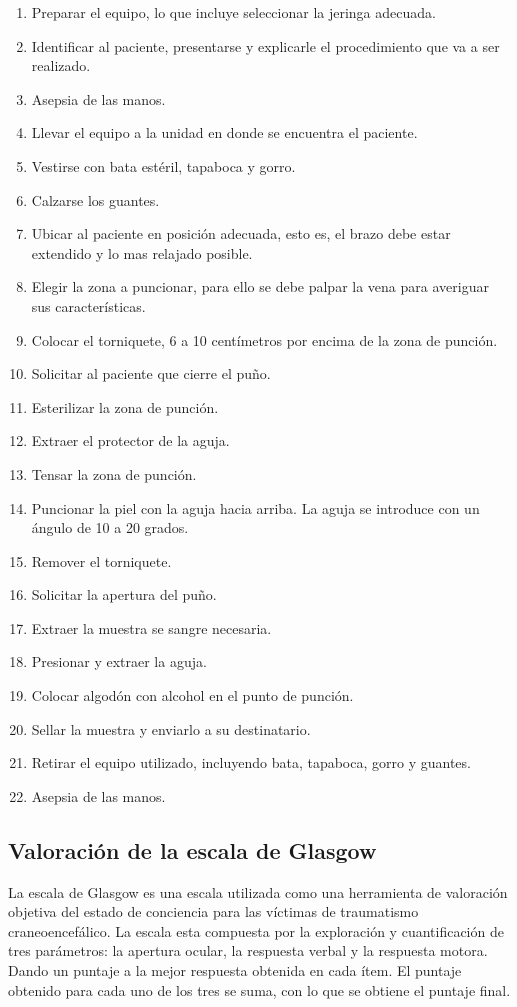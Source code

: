 \begin{enumerate}
\item Preparar el equipo, lo que incluye seleccionar la jeringa adecuada.
\item Identificar al paciente, presentarse y explicarle el procedimiento que va
    a ser realizado.
\item Asepsia de las manos.
\item Llevar el equipo a la unidad en donde se encuentra el paciente.
\item Vestirse con bata estéril, tapaboca y gorro.
\item Calzarse los guantes.
\item Ubicar al paciente en posición adecuada, esto es, el brazo debe estar
    extendido y lo mas relajado posible.
\item Elegir la zona a puncionar, para ello se debe palpar la vena para
    averiguar sus características.
\item Colocar el torniquete, 6 a 10 centímetros por encima de la zona de
    punción.
\item Solicitar al paciente que cierre el puño.
\item Esterilizar la zona de punción.
\item Extraer el protector de la aguja.
\item Tensar la zona de punción.
\item Puncionar la piel con la aguja hacia arriba. La aguja se introduce con un
    ángulo de 10 a 20 grados.
\item Remover el torniquete.
\item Solicitar la apertura del puño.
\item Extraer la muestra se sangre necesaria.
\item Presionar y extraer la aguja.
\item Colocar algodón con alcohol en el punto de punción.
\item Sellar la muestra y enviarlo a su destinatario.
\item Retirar el equipo utilizado, incluyendo bata, tapaboca, gorro y guantes.
\item Asepsia de las manos.
\end{enumerate}


\subsection{Valoración de la escala de Glasgow}

La escala de Glasgow es una escala utilizada como una herramienta de valoración
objetiva del estado de conciencia para las víctimas de traumatismo
craneoencefálico. La escala esta compuesta por la exploración y cuantificación
de tres parámetros: la apertura ocular, la respuesta verbal y la respuesta
motora. Dando un puntaje a la mejor respuesta obtenida en cada ítem. El puntaje
obtenido para cada uno de los tres se suma, con lo que se obtiene el puntaje
final.

